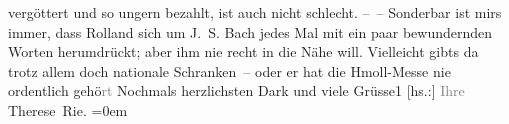 \begin{ledgroupsized}[t]{13cm}
               vergöttert und so ungern bezahlt, ist auch nicht schlecht.\pend
           \pstart
           – – Sonderbar ist mirs immer, dass Rolland
               sich um J. S. Bach jedes Mal mit ein paar
               bewundernden Worten herumdrückt; aber ihm nie recht in die Nähe will. Vielleicht
               gibts da trotz allem doch nationale Schranken – oder er hat die Hmoll-Messe nie ordentlich gehö\textcolor{gray}{rt}\pend
           \pstart
           Nochmals herzlichsten Dark und viele Grüsse1\pend
           \pstart
           {[}hs.:{]} \textcolor{gray}{Ihre}{\\[\baselineskip]}\spacefill\mbox{Therese Rie.}\pend
           \leftskip=0em{}
         
         \endnumbering{}\end{ledgroupsized}  \newcommand{\dateiname}{L02576}\newcommand{\titel}{Therese Rie-Andro an Arthur Schnitzler, 30. 9. 1923}\newcommand{\editorInnen}{Martin Anton Müller und Gerd-Hermann Susen}
      
